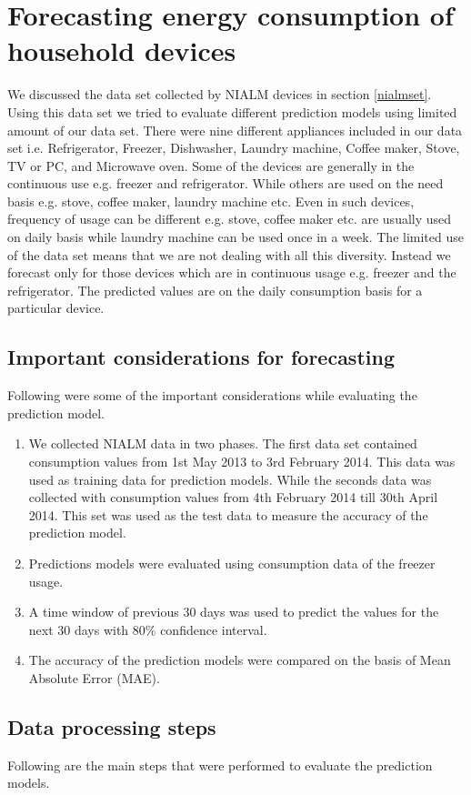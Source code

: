 \section{Forecasting energy consumption of household devices}
We discussed the data set collected by NIALM devices in section \ref{nialmset}. Using this data set we tried to evaluate different prediction models using limited amount of our data set. There were nine different appliances included in our data set i.e. Refrigerator, Freezer, Dishwasher, Laundry machine, Coffee maker, Stove, TV or PC, and Microwave oven. Some of the devices are generally in the continuous use e.g. freezer and refrigerator. While others are used on the need basis e.g. stove, coffee maker, laundry machine etc. Even in such devices, frequency of usage can be different e.g. stove, coffee maker etc. are usually used on daily basis while laundry machine can be used once in a week. The limited use of the data set means that we are not dealing with all this diversity. Instead we forecast only for those devices which are in continuous usage e.g. freezer and the refrigerator. The predicted values are on the daily consumption basis for a particular device.  
\subsection{Important considerations for forecasting}
Following were some of the important considerations while evaluating the prediction model.
\begin{enumerate}
\item We collected NIALM data in two phases. The first data set contained consumption values from 1st May 2013 to 3rd February 2014. This data was used as training data for prediction models. While the seconds data was collected with consumption values from 4th February 2014 till 30th April 2014. This set was used as the test data to measure the accuracy of the prediction model.
\item Predictions models were evaluated using consumption data of the freezer usage.
\item A time window of previous 30 days was used to predict the values for the next 30 days with 80\% confidence interval.
\item  The accuracy of the prediction models were compared on the basis of Mean Absolute Error (MAE).
\end{enumerate}     

\subsection{Data processing steps}
Following are the main steps that were performed to evaluate the prediction models.

